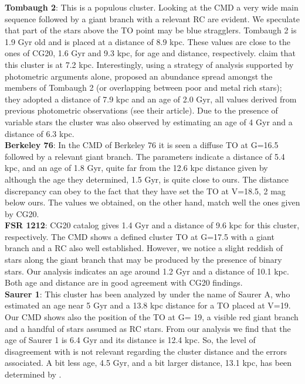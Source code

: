 \documentclass[draft]{aa}
\begin{document}
\textbf{Tombaugh 2}: This is a populous cluster.
Looking at the CMD a very wide main sequence followed by a giant
branch with a relevant RC are evident. We speculate that part of the stars
above the TO point may be blue stragglers. Tombaugh 2 is 1.9 Gyr old and is placed at
a distance of 8.9 kpc. These values are close to the ones of
CG20, 1.6 Gyr and 9.3 kpc, for age and distance, respectively.
\cite{Villanova_2010} claim that this cluster is at 7.2 kpc. Interestingly,
using a strategy of analysis supported by photometric arguments alone,
\cite{Frinchaboy_2008} proposed an abundance spread
amongst the members of Tombaugh 2 (or overlapping between poor and metal
rich stars); they adopted a distance of 7.9 kpc and an age of 2.0 Gyr, all values
derived from previous photometric observations (see their article). Due to the
presence of variable stars the cluster was also observed by
\cite{Kubiak_1992} estimating an age of 4 Gyr and a distance of 6.3 kpc.\\

\textbf{Berkeley 76}: In the CMD of Berkeley 76 it is seen a diffuse TO at G=16.5
followed by a relevant giant branch. The parameters indicate a distance of 5.4
kpc, and an age of 1.8 Gyr, quite far from the 12.6 kpc distance given
by \cite{Carraro_2013_Five} although the age they determined, 1.5 Gyr, is quite
close to ours. The distance discrepancy can obey to the fact that they have set
the TO at V=18.5, 2 mag below ours. The values we obtained, on the other hand,
match well the ones given by CG20.\\

\textbf{FSR 1212}: CG20 catalog gives 1.4 Gyr and a distance of 9.6 kpc for this
cluster, respectively. The CMD shows a defined cluster TO at G=17.5 with a
giant branch and a RC also well established. However, we notice a slight reddish
of stars along the giant branch that may be produced by the presence of binary stars.
Our analysis indicates an age around 1.2 Gyr and a distance of 10.1
kpc. Both age and distance are in good agreement with CG20 findings. \\

\textbf{Saurer 1}:
This cluster has been analyzed by \cite{Carraro_2003} under the name of Saurer
A, who estimated an age near 5 Gyr and a 13.8 kpc distance for a 
TO placed at V=19. Our CMD shows also the position of the
TO at G= 19, a visible red giant branch and a handful of stars assumed as RC
stars. From our analysis we find that the age of Saurer 1 is 6.4 Gyr
and its distance is 12.4 kpc. So, the level of disagreement with
\cite{Carraro_2003} is not relevant regarding the cluster distance and the
errors associated. A bit less age, 4.5 Gyr, and a bit larger distance, 13.1 kpc,
has been determined by \cite{Frinchaboy_2006}.\\
\end{document}
